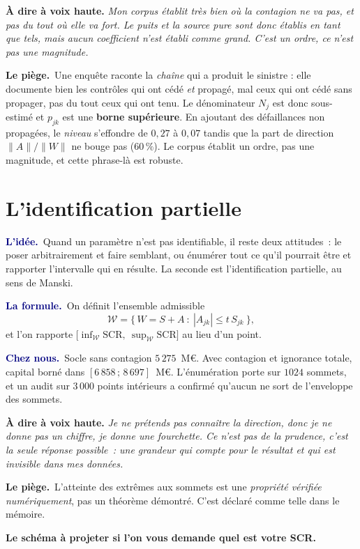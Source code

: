 \documentclass[11pt,a4paper]{article}
\newcommand{\lidee}[1]{\smallskip\noindent\textcolor{navy}{\textbf{L'idée.}}\ #1\par}
\newcommand{\laformule}[1]{\smallskip\noindent\textcolor{navy}{\textbf{La formule.}}\ #1\par}
\newcommand{\cheznous}[1]{\smallskip\noindent\textcolor{navy}{\textbf{Chez nous.}}\ #1\par}
\newcommand{\lepiege}[1]{\smallskip\noindent\textcolor{accent}{\textbf{Le piège.}}\ #1\par}
\newcommand{\laphrase}[1]{\begin{phrasebox}\textbf{À dire à voix haute.} \emph{#1}\end{phrasebox}}
\begin{document}
\laphrase{Mon corpus établit très bien où la contagion \emph{ne va pas}, et pas du tout où elle
va fort. Le puits et la source pure sont donc établis en tant que tels, mais aucun coefficient
n'est établi comme grand. C'est un ordre, ce n'est pas une magnitude.}

\lepiege{Une enquête raconte la \emph{chaîne} qui a produit le sinistre : elle documente bien
les contrôles qui ont cédé \emph{et} propagé, mal ceux qui ont cédé sans propager, pas du tout
ceux qui ont tenu. Le dénominateur $N_j$ est donc sous-estimé et $p_{jk}$ est une \textbf{borne
supérieure}. En ajoutant des défaillances non propagées, le \emph{niveau} s'effondre de
$0{,}27$ à $0{,}07$ tandis que la part de direction $\lVert A\rVert/\lVert W\rVert$ ne bouge
pas ($60\,\%$). Le corpus établit un ordre, pas une magnitude, et cette phrase-là est robuste.}

\section{L'identification partielle}

\lidee{Quand un paramètre n'est pas identifiable, il reste deux attitudes~: le poser
arbitrairement et faire semblant, ou énumérer tout ce qu'il pourrait être et rapporter
l'intervalle qui en résulte. La seconde est l'identification partielle, au sens de Manski.}

\laformule{On définit l'ensemble admissible
\[
  \mathcal{W}=\bigl\{\,W=S+A \ :\ |A_{jk}|\le t\,S_{jk}\ \bigr\},
\]
et l'on rapporte $\bigl[\inf_{\mathcal{W}}\mathrm{SCR},\ \sup_{\mathcal{W}}\mathrm{SCR}\bigr]$
au lieu d'un point.}

\cheznous{Socle sans contagion $5\,275$~M\euro. Avec contagion et ignorance totale, capital
borné dans $[6\,858\,;\,8\,697]$~M\euro. L'énumération porte sur $1024$ sommets, et un audit
sur $3\,000$ points intérieurs a confirmé qu'aucun ne sort de l'enveloppe des sommets.}

\laphrase{Je ne prétends pas connaître la direction, donc je ne donne pas un chiffre, je
donne une fourchette. Ce n'est pas de la prudence, c'est la seule réponse possible~: une
grandeur qui compte pour le résultat et qui est invisible dans mes données.}

\lepiege{L'atteinte des extrêmes aux sommets est une \emph{propriété vérifiée
numériquement}, pas un théorème démontré. C'est déclaré comme telle dans le mémoire.}

\medskip
\noindent\textbf{Le schéma à projeter si l'on vous demande \og quel est votre SCR\fg{}.}
\end{document}
